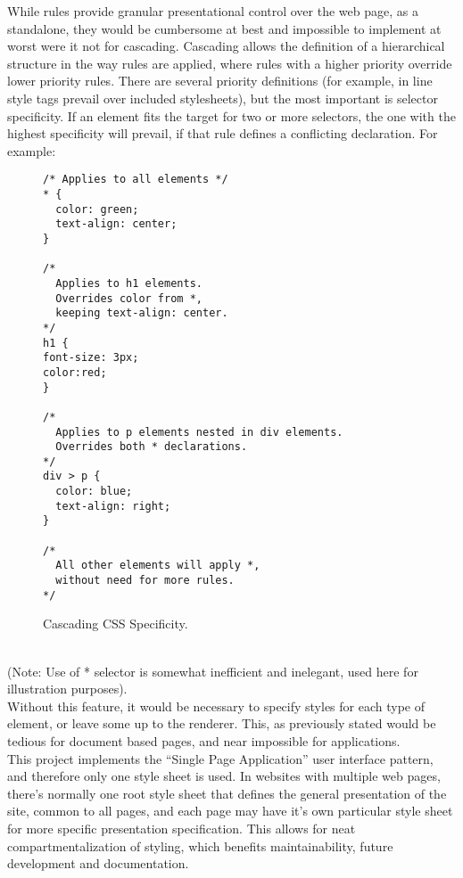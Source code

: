 While rules provide granular presentational control over the web page, as a standalone, they would be cumbersome at best
and impossible to implement at worst were it not for cascading. Cascading allows the definition of a hierarchical structure
in the way rules are applied, where rules with a higher priority override lower priority rules. There are several
priority definitions (for example, in line style tags prevail over included stylesheets), but the most important is
selector specificity. If an element fits the target for two or more selectors, the one with the highest specificity will
prevail, if that rule defines a conflicting declaration. For example:
\begin{figure}[h]
\centering
{}
\begin{verbatim}
/* Applies to all elements */
* {
  color: green;
  text-align: center;
}

/*
  Applies to h1 elements.
  Overrides color from *,
  keeping text-align: center.
*/
h1 {
font-size: 3px;
color:red;
}

/*
  Applies to p elements nested in div elements.
  Overrides both * declarations.
*/
div > p {
  color: blue;
  text-align: right;
}

/*
  All other elements will apply *,
  without need for more rules.
*/
\end{verbatim}
\caption{Cascading CSS Specificity.}
\end{figure}
\\(Note: Use of * selector is somewhat inefficient and inelegant, used here for illustration purposes).\\

Without this feature, it would be necessary to specify styles for each type of element, or leave some up to the renderer.
This, as previously stated would be tedious for document based pages, and near impossible for applications.\\

This project implements the ``Single Page Application'' user interface pattern, and therefore only one style sheet is used.
In websites with multiple web pages, there's normally one root style sheet that defines the general presentation of the
site, common to all pages, and each page may have it's own particular style sheet for more specific presentation
specification. This allows for neat compartmentalization of styling, which benefits maintainability, future development and
documentation.\\

